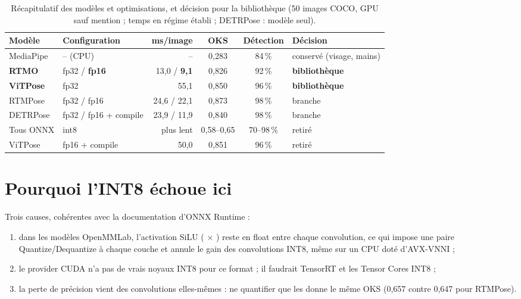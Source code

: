 \documentclass[11pt,a4paper]{report}
\newcommand{\code}[1]{\texttt{\detokenize{#1}}}
\begin{document}
\begin{table}[H]
\centering
\caption{Récapitulatif des modèles et optimisations, et décision pour la bibliothèque (50 images COCO, GPU sauf
mention ; temps en régime établi ; DETRPose : modèle seul).}
\label{tab:decisions}
\footnotesize
\begin{tabular}{@{}llrccl@{}}
\toprule
Modèle & Configuration & ms/image & OKS & Détection & Décision \\
\midrule
MediaPipe & -- (CPU) & -- & 0,283 & 84\,\% & conservé (visage, mains) \\
\textbf{RTMO} & fp32 / \textbf{fp16} & 13,0 / \textbf{9,1} & 0,826 & 92\,\% & \textbf{bibliothèque} \\
\textbf{ViTPose} & fp32 & 55,1 & 0,850 & 96\,\% & \textbf{bibliothèque} \\
RTMPose & fp32 / fp16 & 24,6 / 22,1 & 0,873 & 98\,\% & branche \\
DETRPose & fp32 / fp16 + compile & 23,9 / 11,9 & 0,840 & 98\,\% & branche \\
Tous ONNX & int8 & plus lent & 0,58--0,65 & 70--98\,\% & retiré \\
ViTPose & fp16 + compile & 50,0 & 0,851 & 96\,\% & retiré \\
\bottomrule
\end{tabular}
\end{table}

\section{Pourquoi l'INT8 échoue ici}

Trois causes, cohérentes avec la documentation d'ONNX Runtime \cite{ort_quantization} :
\begin{enumerate}
    \item dans les modèles OpenMMLab, l'activation SiLU (\code{Sigmoid} $\times$ \code{Mul}) reste en float entre
    chaque convolution, ce qui impose une paire Quantize/Dequantize à chaque couche et annule le gain des
    convolutions INT8, même sur un CPU doté d'AVX-VNNI ;
    \item le provider CUDA n'a pas de vrais noyaux INT8 pour ce format ; il faudrait TensorRT et les Tensor Cores INT8
    \cite{ort_tensorrt} ;
    \item la perte de précision vient des convolutions elles-mêmes : ne quantifier que les \code{Conv} donne le
    même OKS (0,657 contre 0,647 pour RTMPose).
\end{enumerate}
\end{document}
